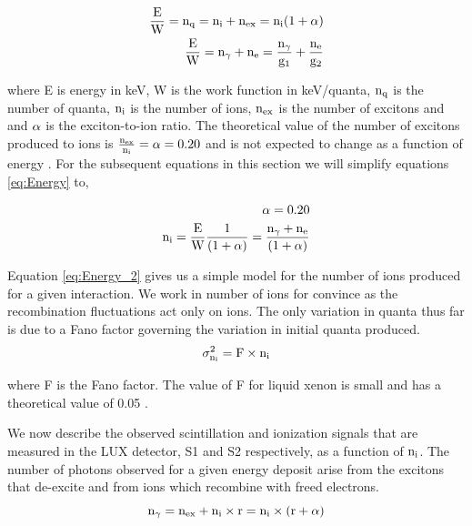 \begin{equation}
\begin{split}
\rm  \frac{E}{W} = n_q = n_i + n_{ex} = n_i(1+\alpha) \\
\rm \frac{E}{W} = n_\gamma + n_e = \frac{n_\gamma}{g_1} + \frac{n_e}{g_2} \\
\label{eq:Energy}
\end{split}
\end{equation}

\noindent where E is energy in keV, W is the work function in keV/quanta, $\rm n_{q}$ is the number of quanta, $\rm n_{i}$ is the number of ions, $\rm n_{ex}$ is the number of excitons and and $\rm \alpha$ is the exciton-to-ion ratio. The theoretical value of the number of excitons produced to ions is $\rm \frac{n_{ex}}{n_{i}}= \alpha = 0.20$ \cite{Doke_alpha} and is not expected to change as a function of energy \cite{alpha_argon} \cite{alpha_xenon} \cite{Dahl_Thesis}. For the subsequent equations in this section we will simplify equations \ref{eq:Energy} to,

\begin{equation}
\begin{split}
\rm \alpha = 0.20\\
\rm  n_i = \frac{E}{W} \frac{1}{(1+\alpha)} =  \frac{n_\gamma + n_e}{(1+\alpha)}  \\ %
\label{eq:Energy_2}
\end{split}
\end{equation}

\noindent Equation \ref{eq:Energy_2} gives us a simple model for the number of ions produced for a given interaction. We work in number of ions for convince as the recombination fluctuations act only on ions. The only variation in quanta thus far is due to a Fano factor governing the variation in initial quanta produced. 
\begin{equation}
\rm \sigma_{n_i}^2  = F \times n_i
\label{eq:Fano_1}
\end{equation}

\noindent where F is the Fano factor. The value of F for liquid xenon is small and has a theoretical value of 0.05 \cite{FanoTheoretical}.


We now describe the observed scintillation and ionization signals that are measured in the LUX detector, S1  and S2 respectively, as a function of $\rm n_i$. The number of photons observed for a given energy deposit arise from the excitons that de-excite and from ions which recombine with freed electrons.
\begin{equation}
\rm  n_\gamma = n_{ex} + n_i\times r = n_i\times (r+\alpha) \\
\label{eq:Photons}
\end{equation}

